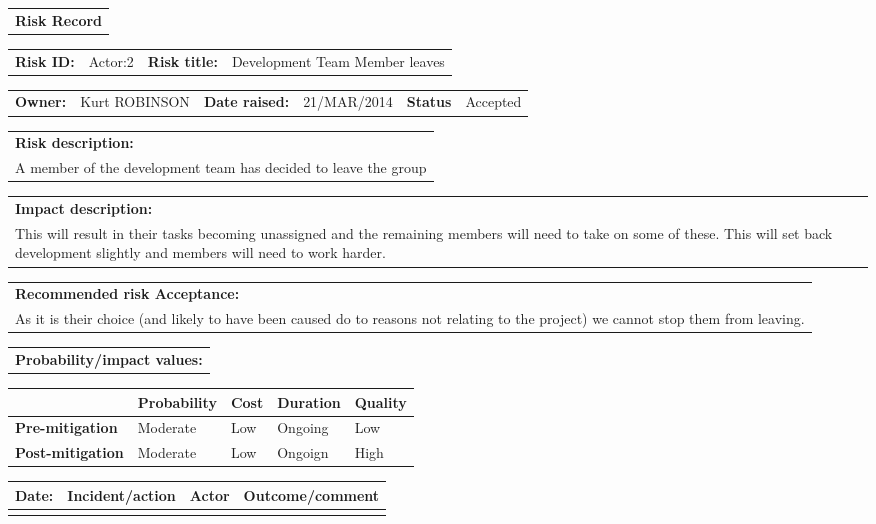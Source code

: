 \begin{table}
	\begin{tabularx}{\textwidth}{| X |}
		\hline
		\textbf{Risk Record} \\
	\end{tabularx}
	\begin{tabularx}{\textwidth}{| l | X | l | X |}
		\hline
		\textbf{Risk ID:} & Actor:2 & \textbf{Risk title:} & Development Team Member leaves \\
	\end{tabularx}
	\begin{tabularx}{\textwidth}{| l | X | l | X | l | X |}
		\hline
		\textbf{Owner:} & Kurt ROBINSON & \textbf{Date raised:} & 21/MAR/2014 & \textbf{Status} & Accepted \\
	\end{tabularx}
	\begin{tabularx}{\textwidth}{| X |}
		\hline
		\textbf{Risk description:} \\ A member of the development team has decided to leave the group \\
	\end{tabularx}
	\begin{tabularx}{\textwidth}{| X |}
		\hline
		\textbf{Impact description:} \\ This will result in their tasks becoming unassigned and the remaining members will need to take on some of these. This will set back development slightly and members will need to work harder. \\
	\end{tabularx}
	\begin{tabularx}{\textwidth}{| X |}
		\hline
		\textbf{Recommended risk Acceptance:} \\ As it is their choice (and likely to have been caused do to reasons not relating to the project) we cannot stop them from leaving. \\
	\end{tabularx}
	\begin{tabularx}{\textwidth}{| X |}
		\hline
		\textbf{Probability/impact values:} \\
	\end{tabularx}
	\begin{tabularx}{\textwidth}{| l | l | X | X | X |}
		\hline
		 &  \textbf{Probability} & \textbf{Cost} & \textbf{Duration} & \textbf{Quality} \\ \hline
		\textbf{Pre-mitigation} & Moderate & Low & Ongoing & Low\\ \hline
		\textbf{Post-mitigation} & Moderate & Low & Ongoign & High \\ \hline \hline
	\end{tabularx}
	\begin{tabularx}{\textwidth}{| l | X | l | X |}
		\hline
		\textbf{Date:} & \textbf{Incident/action} & \textbf{Actor} & \textbf{Outcome/comment} \\ \hline
		 & &  &  \\ \hline
	\end{tabularx}
\end{table}

